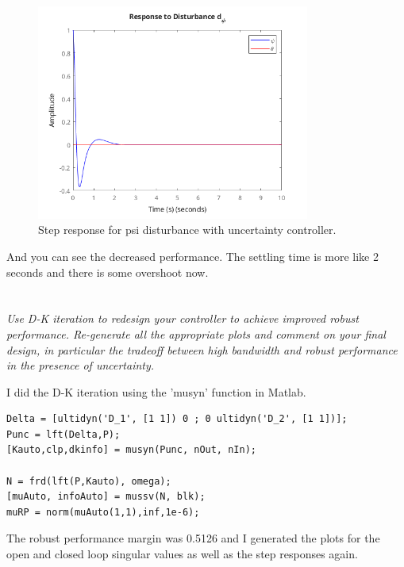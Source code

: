 \documentclass{article}
\begin{document}
\begin{figure}[H]
    \centering
    \includegraphics[width=0.8\textwidth]{stepDpsiRP.png}
    \caption{Step response for psi disturbance with uncertainty controller.}
    \label{fig:stepDpsiRP}
\end{figure}

And you can see the decreased performance.
The settling time is more like 2 seconds and there is some overshoot now.

\section{}
\textit{Use D-K iteration to redesign your controller to achieve improved robust performance. Re-generate all the appropriate plots and comment on your final design, in particular the tradeoff between high bandwidth and robust performance in the presence of uncertainty.}

I did the D-K iteration using the 'musyn' function in Matlab.

\begin{lstlisting}[style=matlabstyle]
Delta = [ultidyn('D_1', [1 1]) 0 ; 0 ultidyn('D_2', [1 1])];
Punc = lft(Delta,P);
[Kauto,clp,dkinfo] = musyn(Punc, nOut, nIn);

N = frd(lft(P,Kauto), omega);
[muAuto, infoAuto] = mussv(N, blk);
muRP = norm(muAuto(1,1),inf,1e-6);    
\end{lstlisting}

The robust performance margin was 0.5126 and I generated the plots for the open and closed loop singular values as well as the step responses again.
\end{document}
